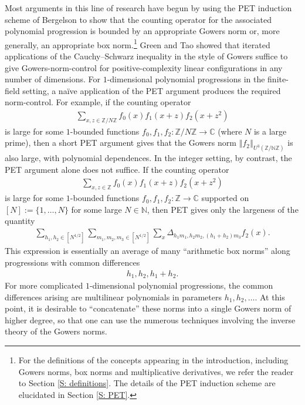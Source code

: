 \documentclass[11pt]{amsart}
\theoremstyle{definition}
\newcommand{\C}{{\mathbb C}}
\newcommand{\N}{{\mathbb N}}
\newcommand{\Z}{{\mathbb Z}}
\newcommand{\norm}[1]{\left\Vert #1\right\Vert}
\begin{document}
Most arguments in this line of research have begun by using the PET induction scheme of Bergelson \cite{Ber87} to show that the counting operator for the associated polynomial progression is bounded by an appropriate Gowers norm or, more generally, an appropriate box norm.\footnote{For the definitions of the concepts appearing in the introduction, including Gowers norms, box norms and multiplicative derivatives, we refer the reader to Section \ref{S: definitions}. The details of the PET induction scheme are elucidated in Section \ref{S: PET}.}  Green and Tao \cite{GT10b} showed that iterated applications of the Cauchy--Schwarz inequality in the style of Gowers \cite{Go98a, Go01} suffice to give Gowers-norm-control for positive-complexity linear configurations in any number of dimensions.  For $1$-dimensional polynomial progressions in the finite-field setting, a na\"ive application of the PET argument produces the required norm-control.  For example, if the counting operator
\begin{align*}
\sum_{x,z\in\Z/N\Z} f_0(x)f_1(x+z)f_2(x+z^2) %
\end{align*}
is large for some $1$-bounded functions $f_0, f_1, f_2:\Z/N\Z\to\C$ (where $N$ is a large prime), then a short PET argument gives that the Gowers norm $\norm{f_2}_{U^3(\Z/\N\Z)}$ is also large, with polynomial dependences.  In the integer setting, by contrast, the PET argument alone does not suffice.  If the counting operator
\begin{align*}
    \sum_{x, z\in\Z}f_0(x)f_1(x+z)f_2(x+z^2)
\end{align*}
is large for some $1$-bounded functions $f_0, f_1, f_2:\Z\to\C$ supported on $[N]:=\{1, \ldots, N\}$ for some large $N\in\N$, then PET gives only the largeness of the quantity
\begin{align*}
    \sum_{h_1, h_2\in[N^{1/2}]}\sum_{m_1,m_2,m_3\in[N^{1/2}]}\sum_x\Delta_{h_1 m_1, h_2 m_2, (h_1+h_2) m_3}f_2(x).
\end{align*}
This expression is essentially an average of many ``arithmetic box norms'' along progressions with common differences 
\begin{align}\label{E: single dim directions}
    h_1, h_2, h_1 + h_2.    
\end{align}
For more complicated $1$-dimensional polynomial progressions, the common differences arising are multilinear polynomials in parameters $h_1, h_2, \ldots$.  At this point, it is desirable to ``concatenate'' these norms into a single Gowers norm of higher degree, so that one can use the numerous techniques involving the inverse theory of the Gowers norms.
\end{document}
